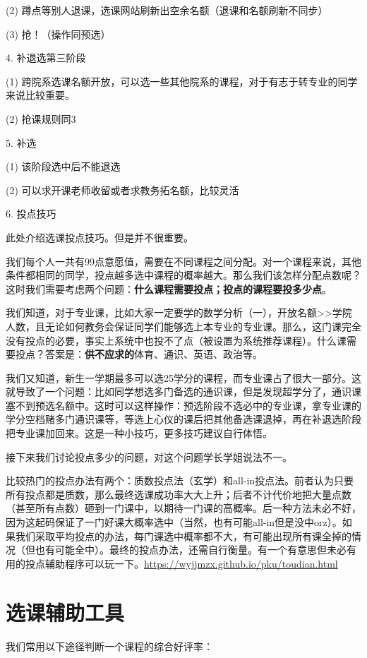 \documentclass[11pt,oneside]{book}
\begin{document}
(2) 蹲点等别人退课，选课网站刷新出空余名额（退课和名额刷新不同步）

(3) 抢！（操作同预选）

4. 补退选第三阶段

(1) 跨院系选课名额开放，可以选一些其他院系的课程，对于有志于转专业的同学来说比较重要。

(2) 抢课规则同3

5. 补选

(1) 该阶段选中后不能退选

(2) 可以求开课老师收留或者求教务拓名额，比较灵活

6. 投点技巧

此处介绍选课投点技巧。但是并不很重要。

我们每个人一共有99点意愿值，需要在不同课程之间分配。对一个课程来说，其他条件都相同的同学，投点越多选中课程的概率越大。那么我们该怎样分配点数呢？这时我们需要考虑两个问题：\textbf{\textbf{什么课程需要投点；投点的课程要投多少点}}。

我们知道，对于专业课，比如大家一定要学的数学分析（一），开放名额>>学院人数，且无论如何教务会保证同学们能够选上本专业的专业课。那么，这门课完全没有投点的必要，事实上系统中也投不了点（被设置为系统推荐课程）。什么课需要投点？答案是：\textbf{\textbf{供不应求的}}体育、通识、英语、政治等。

我们又知道，新生一学期最多可以选25学分的课程，而专业课占了很大一部分。这就导致了一个问题：比如同学想选多门备选的通识课，但是发现超学分了，通识课塞不到预选名额中。这时可以这样操作：预选阶段不选必中的专业课，拿专业课的学分空档赌多门通识课等，等选上心仪的课后把其他备选课退掉，再在补退选阶段把专业课加回来。这是一种小技巧，更多技巧建议自行体悟。

接下来我们讨论投点多少的问题，对这个问题学长学姐说法不一。

比较热门的投点办法有两个：质数投点法（玄学）和all-in投点法。前者认为只要所有投点都是质数，那么最终选课成功率大大上升；后者不计代价地把大量点数（甚至所有点数）砸到一门课中，以期待一门课的高概率。后一种方法未必不好，因为这起码保证了一门好课大概率选中（当然，也有可能all-in但是没中orz）。如果我们采取平均投点的办法，每门课选中概率都不大，有可能出现所有课全掉的情况（但也有可能全中）。最终的投点办法，还需自行衡量。有一个有意思但未必有用的投点辅助程序可以玩一下。\href{https://wyjjmzx.github.io/pku/toudian.html}{https://wyjjmzx.github.io/pku/toudian.html}


\section{选课辅助工具}
我们常用以下途径判断一个课程的综合好评率：
\end{document}
